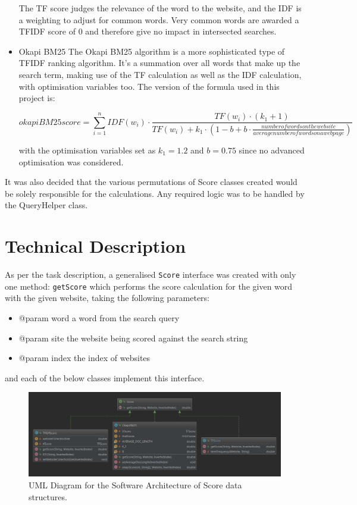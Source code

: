 \begin{itemize}
The TF score judges the relevance of the word to the website, and the IDF is a weighting to adjust for common words.
Very common words are awarded a TFIDF score of 0 and therefore give no impact in intersected searches.

\item Okapi BM25
The Okapi BM25 algorithm is a more sophisticated type of TFIDF ranking algorithm.
It's a summation over all words that make up the search term, making use of the TF calculation as well as the IDF calculation, with optimisation variables too.
The version of the formula used in this project is:

\begin{equation*}
    okapi BM 25 score = \sum_{i=1}^n IDF(w_i) \cdot \frac{TF(w_i)\cdot (k_1 + 1)}{TF(w_i) + k_1\cdot(1 - b + b\cdot \frac{number of words on the website}{average number of words on a webpage})}
\end{equation*}

with the optimisation variables set as $k_1 = 1.2$ and $b = 0.75$ since no advanced optimisation was considered.
\end{itemize}

It was also decided that the various permutations of Score classes created would be solely responsible for the calculations.
Any required logic was to be handled by the QueryHelper class.

\section{Technical Description}
As per the task description, a generalised {\tt Score} interface was created with only one method: {\tt getScore} which performs the score calculation for the given word with the given website, taking the following parameters:

\begin{itemize}
    \item @param word a word from the search query
    \item @param site the website being scored against the search string
    \item @param index the index of websites
\end{itemize}

and each of the below classes implement this interface.

\begin{figure}[t]
    \centering
    \includegraphics[width=\textwidth]{figures/diagram-score}
    \caption{UML Diagram for the Software Architecture of Score data structures.}
    \label{fig:score:uml}
\end{figure}

